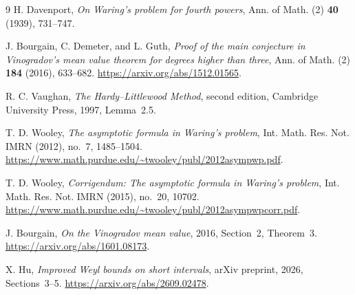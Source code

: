 \documentclass[11pt]{article}
\theoremstyle{remark}\newtheorem*{remark}{Remark}
\begin{document}
\begin{thebibliography}{9}
H. Davenport, \emph{On Waring's problem for fourth powers},
Ann. of Math. (2) \textbf{40} (1939), 731--747.

J. Bourgain, C. Demeter, and L. Guth,
\emph{Proof of the main conjecture in Vinogradov's mean value theorem
for degrees higher than three}, Ann. of Math. (2) \textbf{184} (2016),
633--682. \url{https://arxiv.org/abs/1512.01565}.

R. C. Vaughan, \emph{The Hardy--Littlewood Method}, second edition,
Cambridge University Press, 1997, Lemma~2.5.

T. D. Wooley, \emph{The asymptotic formula in Waring's problem},
Int. Math. Res. Not. IMRN (2012), no.~7, 1485--1504.
\url{https://www.math.purdue.edu/~twooley/publ/2012asympwp.pdf}.

T. D. Wooley, \emph{Corrigendum: The asymptotic formula in Waring's
problem}, Int. Math. Res. Not. IMRN (2015), no.~20, 10702.
\url{https://www.math.purdue.edu/~twooley/publ/2012asympwpcorr.pdf}.

J. Bourgain, \emph{On the Vinogradov mean value}, 2016,
Section~2, Theorem~3. \url{https://arxiv.org/abs/1601.08173}.

X. Hu, \emph{Improved Weyl bounds on short intervals},
arXiv preprint, 2026, Sections~3--5.
\url{https://arxiv.org/abs/2609.02478}.
\end{thebibliography}
\end{document}
